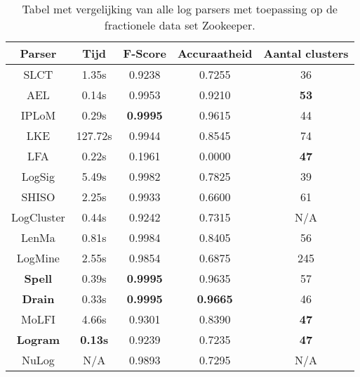 \begin{table}[!htp]
    \caption{Tabel met vergelijking van alle log parsers met toepassing op de fractionele data set Zookeeper.}
    \label{table:Zookeeper}
    \begin{center}
        \begin{tabular}{||c | c | c | c | c||} 
            \hline
            Parser & Tijd & F-Score & Accuraatheid & Aantal clusters \\ [0.5ex] 
            \hline\hline
            SLCT & 1.35s & 0.9238 & 0.7255 & 36 \\
            
            AEL & 0.14s & 0.9953 & 0.9210 & \textbf{53} \\ 
            
            IPLoM & 0.29s & \textbf{0.9995} & 0.9615 & 44 \\
            
            LKE & 127.72s & 0.9944 & 0.8545 & 74 \\
            
            LFA & 0.22s & 0.1961 & 0.0000 & \textbf{47} \\
            
            LogSig & 5.49s & 0.9982 & 0.7825 & 39 \\
            
            SHISO & 2.25s & 0.9933 & 0.6600 & 61 \\
            
            LogCluster & 0.44s & 0.9242 & 0.7315 & N/A \\
            
            LenMa & 0.81s & 0.9984 & 0.8405 & 56 \\
            
            LogMine & 2.55s & 0.9854 & 0.6875 & 245 \\
            
            \textbf{Spell} & 0.39s & \textbf{0.9995} & 0.9635 & 57 \\
            
            \textbf{Drain} & 0.33s & \textbf{0.9995} & \textbf{0.9665} & 46\\
            
            MoLFI & 4.66s & 0.9301 & 0.8390 & \textbf{47} \\
            
            \textbf{Logram} & \textbf{0.13s} & 0.9239 & 0.7235 & \textbf{47} \\
            
            NuLog & N/A & 0.9893 & 0.7295 & N/A \\
            \hline
        \end{tabular}
    \end{center}
\end{table}

